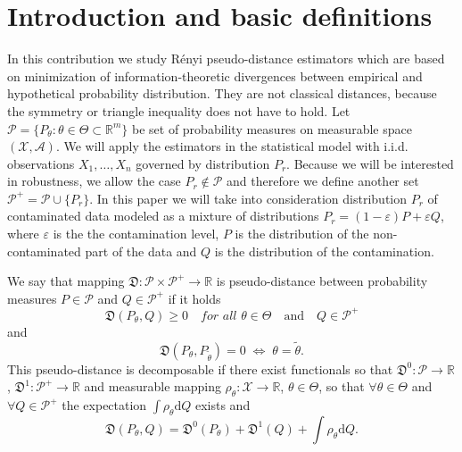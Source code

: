 
{\normalsize


\section{Introduction and basic definitions}
In this contribution we study R\'{e}nyi pseudo-distance estimators which are based on minimization of information-theoretic divergences between empirical and hypothetical probability distribution. They are not classical distances, because the symmetry or triangle inequality does not have to hold. Let $\mathcal{P} = \lbrace P_\theta : \theta \in \Theta \subset \mathbb{R}^m \rbrace$ be set of probability measures on measurable space $\left(\mathcal{X},\mathcal{A}\right)$.
We will apply the estimators in the statistical model with i.i.d. observations $X_1,\ldots,X_n$ governed by distribution $P_r$. 
Because we will be interested in robustness, we allow the case $P_r \notin \mathcal{P}$ and therefore we define another set $\mathcal{P}^+ = \mathcal{P} \cup \lbrace P_r \rbrace $. In this paper we will take into consideration distribution $P_r$ of contaminated data modeled as a mixture of distributions $P_r = (1-\varepsilon)P + \varepsilon Q$, where $\varepsilon$ is the the contamination level, $P$ is the distribution of the non-contaminated part of the data and $Q$ is the distribution of the contamination.


\begin{definition}
	We say that mapping $\mathfrak{D}:\mathcal{P}\times\mathcal{P}^+ \rightarrow \mathbb{R}$ is pseudo-distance between probability measures $P \in \mathcal{P}$ and $Q \in \mathcal{P}^+$ if it holds		
		\begin{equation}
			\mathfrak{D}(P_\theta,Q) \geq 0 \quad \textit{for all } \theta \in \Theta \quad \text{and} \quad Q \in \mathcal{P}^+
		\end{equation}
		and 		
		\begin{equation}
			\mathfrak{D}(P_\theta,P_{\tilde{\theta}})=0 \; \Leftrightarrow \; \theta=\tilde{\theta}.
		\end{equation}	
	This pseudo-distance is decomposable if there exist functionals so that
		 $\mathfrak{D}^0:\mathcal{P}\rightarrow\mathbb{R}$, $ \mathfrak{D}^1:\mathcal{P}^+ \rightarrow \mathbb{R}$ and measurable mapping
		  $\rho_\theta : \mathcal{X} \rightarrow \mathbb{R}$, $ \theta \in \Theta$, so that $\forall \theta \in \Theta$ and $\forall Q \in \mathcal{P}^+$ the expectation $\int{\rho_\theta }\mathrm{d}Q$ exists and
		\begin{equation}
			\mathfrak{D} (P_\theta, Q) = \mathfrak{D}^0 (P_\theta) + \mathfrak{D}^1 (Q) + \int \rho_\theta \mathrm{d}Q.
		\end{equation}
\end{definition}

}
